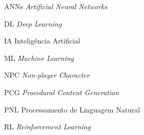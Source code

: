 \begin{siglas}
 \item[ANNs] \textit{Artificial Neural Networks}
 \item[DL] \textit{Deep Learning}
 \item[IA] Inteligência Artificial
 \item[ML] \textit{Machine Learning}
 \item[NPC] \textit{Non-player Character}
 \item[PCG] \textit{Procedural Content Generation}
 \item[PNL] Processamento de Linguagem Natural
 \item[RL] \textit{Reinforcement Learning}
\end{siglas}
